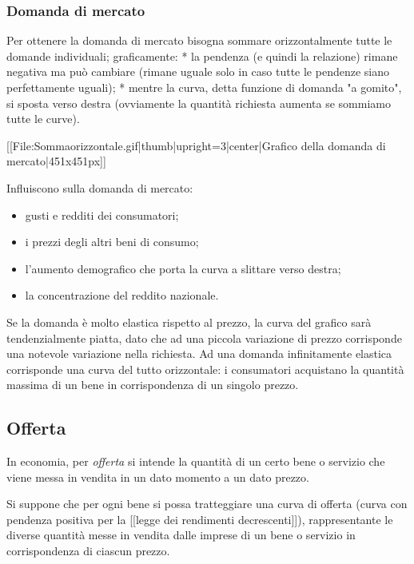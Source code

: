 \subsubsection{Domanda di mercato}

Per ottenere la domanda di mercato bisogna sommare orizzontalmente tutte le 
domande individuali; graficamente:
* la pendenza (e quindi la relazione) rimane negativa ma può cambiare (rimane 
uguale solo in caso tutte le pendenze siano perfettamente uguali);
* mentre la curva, detta funzione di domanda "a gomito", si sposta verso destra 
(ovviamente la quantità richiesta aumenta se sommiamo tutte le curve).

[[File:Sommaorizzontale.gif|thumb|upright=3|center|Grafico della domanda di 
mercato|451x451px]]

Influiscono sulla domanda di mercato: 
\begin{itemize} [noitemsep]
 \item gusti e redditi dei consumatori;
 \item i prezzi degli altri beni di consumo; 
 \item l'aumento demografico che porta la curva a slittare verso destra; 
 \item la concentrazione del reddito nazionale.
\end{itemize}

Se la domanda è molto elastica rispetto al prezzo, la curva del grafico sarà 
tendenzialmente piatta, dato che ad una piccola variazione di prezzo 
corrisponde una notevole variazione nella richiesta. Ad una domanda 
infinitamente elastica corrisponde una curva del tutto orizzontale: i 
consumatori acquistano la quantità massima di un bene in corrispondenza di un 
singolo prezzo.

\subsection{Offerta}

In economia, per \emph{offerta} si intende la quantità di un certo bene o 
servizio che viene messa in vendita in un dato momento a un dato prezzo.

Si suppone che per ogni bene si possa tratteggiare una curva di offerta (curva 
con pendenza positiva per la [[legge dei rendimenti decrescenti]]), 
rappresentante le diverse quantità messe in vendita dalle imprese di un bene o 
servizio in corrispondenza di ciascun prezzo.

